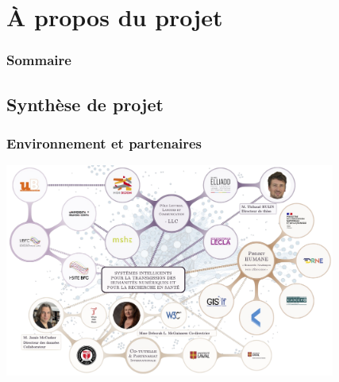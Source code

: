 \documentclass[xcolor=dvipsnames]{beamer}
\begin{document}
\section{À propos du projet}

\begin{frame}
\frametitle{Sommaire}
\tableofcontents[currentsection]
\end{frame}

\subsection{Synthèse de projet}
\begin{frame}[fragile]
\frametitle{Environnement et partenaires}
\includegraphics[height = 7cm]{images/mindmap.png}
\end{frame}


\end{document}
